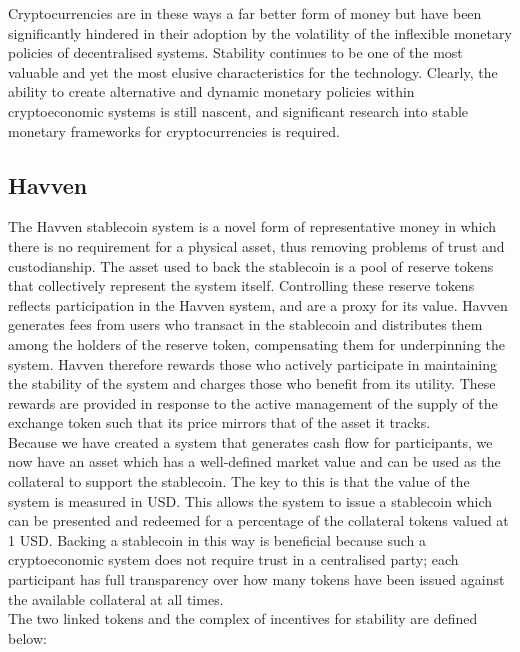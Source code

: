 \noindent Cryptocurrencies are in these ways a far better form of money but have been significantly hindered
in their adoption by the volatility of the inflexible monetary policies of decentralised systems. Stability continues to be one of the most valuable and yet the most elusive
characteristics for the technology. Clearly, the ability to create alternative and dynamic monetary policies within
cryptoeconomic systems is still nascent, and significant research into stable monetary
frameworks for cryptocurrencies is required.

\subsection{Havven}

\noindent The Havven stablecoin system is a novel form of representative money in which there is no requirement for a physical
asset, thus removing problems of trust and custodianship. The asset used to back the stablecoin is 
a pool of reserve tokens that collectively represent the system itself. Controlling these reserve tokens reflects participation in the Havven system,
and are a proxy for its value. Havven generates fees from users who transact in the stablecoin and distributes them among the holders of the reserve token, compensating them for underpinning the system.
Havven therefore rewards those who actively participate in maintaining the stability of the system and charges those who benefit from its utility. These rewards are provided in response to the active management of the supply of the exchange token such that its price mirrors that of the asset it tracks. \\

\noindent Because we have created a system that generates cash flow for participants, we now have an asset which has a well-defined market value and can be used as the collateral to support the stablecoin. The key to this is that the value of the
system is measured in USD. This allows the system to issue a stablecoin which can be presented and redeemed for a
percentage of the collateral tokens valued at 1 USD. Backing a stablecoin in this way is beneficial because
such a cryptoeconomic system does not require trust in a centralised party; each participant has full
transparency over how many tokens have been issued against the available collateral at all times. \\

\noindent The two linked tokens and the complex of incentives for stability are defined below:

